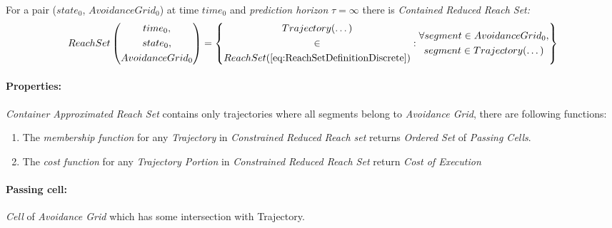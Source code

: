     \begin{definition}\label{def:ContainedReducedReachSet}
        For a pair ($state_0$, $AvoidanceGrid_0$) at time $time_0$ and \emph{prediction horizon} $\tau=\infty$ there is \emph{Contained Reduced Reach Set:}
        \begin{equation}\label{eq:containedReachSet}
            ReachSet\left(\begin{gathered}time_0,\\state_0,\\AvoidanceGrid_0\end{gathered}\right) = 
            \left\{
                \begin{gathered}
                Trajectory(\dots) \\\in\\ ReachSet(\ref{eq:ReachSetDefinitionDiscrete})
                \end{gathered}
                :
                \begin{gathered}
                \forall segment \in AvoidanceGrid_0,\\ segment \in Trajectory(\dots)    
                \end{gathered}
            \right\}
        \end{equation}
        
        \paragraph{Properties:} \emph{Container Approximated Reach Set} contains only trajectories where all segments belong to \emph{Avoidance Grid}, there are following functions:
        \begin{enumerate}
            \item The \emph{membership function} for any \emph{Trajectory} in \emph{Constrained Reduced Reach set} returns \emph{Ordered Set} of \emph{Passing Cells}. 
            
            \item The \emph{cost function} for any \emph{Trajectory Portion} in \emph{Constrained Reduced Reach Set} return \emph{Cost of Execution}
        \end{enumerate}
        
        \paragraph{Passing cell:} \emph{Cell} of \emph{Avoidance Grid} which has some intersection with {Trajectory}.
    \end{definition}
    
